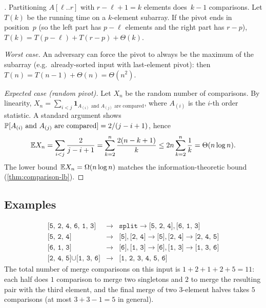 \begin{proof}[]
Partitioning $A[\ell..r]$ with $r - \ell + 1 = k$ elements does~$k - 1$
comparisons. Let $T(k)$ be the running time on a $k$-element
subarray. If the pivot ends in position~$p$ (so the left part has
$p - \ell$ elements and the right part has $r - p$),
$T(k) = T(p - \ell) + T(r - p) + \Theta(k)$.

\emph{Worst case.} An adversary can force the pivot to always be the
maximum of the subarray (e.g.\ already-sorted input with last-element
pivot): then $T(n) = T(n - 1) + \Theta(n) = \Theta(n^2)$.

\emph{Expected case (random pivot).} Let $X_n$ be the random number
of comparisons. By linearity, $X_n = \sum_{i < j} \mathbf{1}_{A_{(i)} \text{ and } A_{(j)} \text{ are compared}}$,
where $A_{(i)}$ is the $i$-th order statistic. A standard argument
shows $\mathbb{P}[\text{$A_{(i)}$ and $A_{(j)}$ are compared}] = 2/(j - i + 1)$,
hence
\[
  \mathbb{E} X_n = \sum_{i < j} \frac{2}{j - i + 1}
        = \sum_{k=2}^{n} \frac{2 (n - k + 1)}{k}
        \leq 2 n \sum_{k=2}^{n} \frac{1}{k}
        = \Theta(n \log n).
\]
The lower bound $\mathbb{E} X_n = \Omega(n \log n)$ matches the
information-theoretic bound (\cref{thm:comparison-lb}).
\end{proof}

\subsection*{Examples}

\begin{example}
\label{ex:mergesort-trace}
\[
  \begin{array}{rcl}
    \texttt{[5, 2, 4, 6, 1, 3]} & \to & \texttt{split} \to \texttt{[5, 2, 4]}, \texttt{[6, 1, 3]} \\
    \texttt{[5, 2, 4]} & \to & \texttt{[5]}, \texttt{[2, 4]} \to \texttt{[5]}, \texttt{[2, 4]} \to \texttt{[2, 4, 5]} \\
    \texttt{[6, 1, 3]} & \to & \texttt{[6]}, \texttt{[1, 3]} \to \texttt{[6]}, \texttt{[1, 3]} \to \texttt{[1, 3, 6]} \\
    \texttt{[2, 4, 5]} \cup \texttt{[1, 3, 6]} & \to & \texttt{[1, 2, 3, 4, 5, 6]}
  \end{array}
\]
The total number of merge comparisons on this input is
$1 + 2 + 1 + 2 + 5 = 11$: each half does $1$ comparison to merge two
singletons and $2$ to merge the resulting pair with the third element,
and the final merge of two 3-element halves takes $5$ comparisons (at
most $3 + 3 - 1 = 5$ in general).
\end{example}

